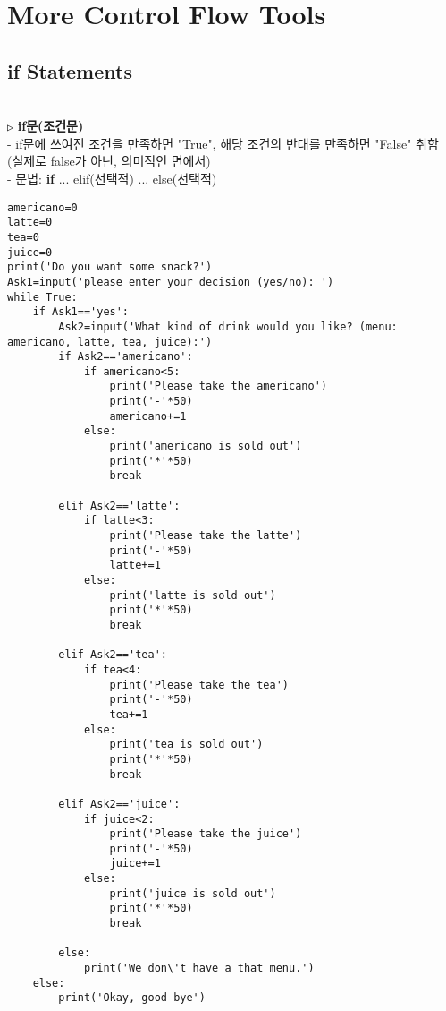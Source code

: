 \documentclass[11pt,a4paper]{article}
\begin{document}
\section{\LARGE\textbf{More Control Flow Tools}}
\begin{spacing}{1.5}
\subsection{\Large\textbf{if Statements}}\\
\texttt{▷} \textbf{if문(조건문)}\\

- if문에 쓰여진 조건을 만족하면 "True", 해당 조건의 반대를 만족하면 "False" 취함\\
\hspace*{1em}(실제로 false가 아닌, 의미적인 면에서)\\

- 문법: \textbf{if} ... elif(선택적) ... else(선택적)
\begin{lstlisting}[label={list:first},caption=Coffee machin]
americano=0
latte=0
tea=0
juice=0
print('Do you want some snack?')
Ask1=input('please enter your decision (yes/no): ')
while True:
    if Ask1=='yes':
        Ask2=input('What kind of drink would you like? (menu: americano, latte, tea, juice):')
        if Ask2=='americano':
            if americano<5:
                print('Please take the americano')
                print('-'*50)
                americano+=1
            else:
                print('americano is sold out')
                print('*'*50)
                break

        elif Ask2=='latte':
            if latte<3:
                print('Please take the latte')
                print('-'*50)
                latte+=1
            else:
                print('latte is sold out')
                print('*'*50)
                break

        elif Ask2=='tea':
            if tea<4:
                print('Please take the tea')
                print('-'*50)
                tea+=1
            else:
                print('tea is sold out')
                print('*'*50)
                break

        elif Ask2=='juice':
            if juice<2:
                print('Please take the juice')
                print('-'*50)
                juice+=1
            else:
                print('juice is sold out')
                print('*'*50)
                break

        else:
            print('We don\'t have a that menu.')
    else:
        print('Okay, good bye')
\end{lstlisting}\\


\end{spacing}
\end{document}
